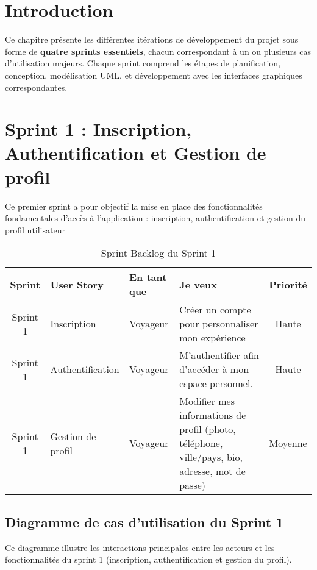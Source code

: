 \section{Introduction}

Ce chapitre présente les différentes itérations de développement du projet sous forme de \textbf{quatre sprints essentiels}, chacun correspondant à un ou plusieurs cas d'utilisation majeurs. Chaque sprint comprend les étapes de planification, conception, modélisation UML, et développement avec les interfaces graphiques correspondantes.

\section{Sprint 1 : Inscription, Authentification et Gestion de profil}

Ce premier sprint a pour objectif la mise en place des fonctionnalités fondamentales d'accès à l'application : inscription, authentification et gestion du profil utilisateur

\begin{table}[H]
\centering
\begin{tabularx}{\textwidth}{|c|l|l|X|c|}
\hline
\textbf{Sprint} & \textbf{User Story} & \textbf{En tant que} & \textbf{Je veux} & \textbf{Priorité} \\
\hline
Sprint 1 & Inscription & Voyageur & Créer un compte pour personnaliser mon expérience & Haute \\
\hline
Sprint 1 & Authentification & Voyageur & M’authentifier afin d’accéder à mon espace personnel. & Haute \\
\hline
Sprint 1 & Gestion de profil & Voyageur & Modifier mes informations de profil (photo, téléphone, ville/pays, bio, adresse, mot de passe) & Moyenne \\
\hline
\end{tabularx}
\caption{Sprint Backlog du Sprint 1}
\end{table}

\subsection{Diagramme de cas d’utilisation du Sprint 1}

Ce diagramme illustre les interactions principales entre les acteurs et les fonctionnalités du sprint 1 (inscription, authentification et gestion du profil).

